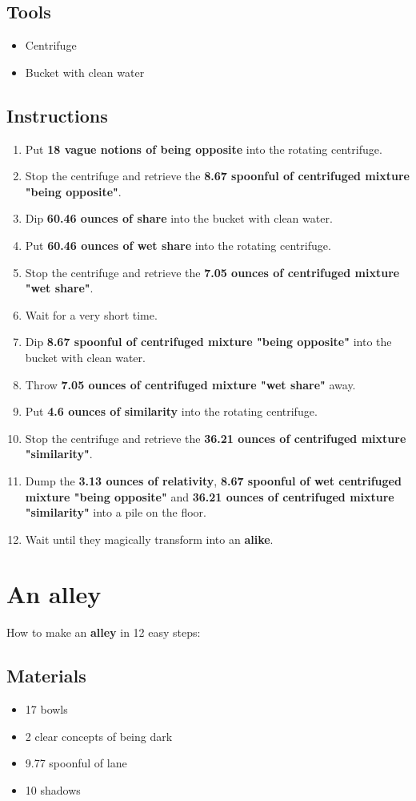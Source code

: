\documentclass{article}
\begin{document}
\subsection{Tools}\begin{itemize}
\item 
Centrifuge
\item 
Bucket with clean water
\end{itemize}
\subsection{Instructions}\begin{enumerate}
\item 
Put \textbf{18 vague notions of being opposite} into the rotating centrifuge.
\item 
Stop the centrifuge and retrieve the \textbf{8.67 spoonful of centrifuged mixture "being opposite"}.
\item 
Dip \textbf{60.46 ounces of share} into the bucket with clean water.
\item 
Put \textbf{60.46 ounces of wet share} into the rotating centrifuge.
\item 
Stop the centrifuge and retrieve the \textbf{7.05 ounces of centrifuged mixture "wet share"}.
\item 
Wait for a very short time.
\item 
Dip \textbf{8.67 spoonful of centrifuged mixture "being opposite"} into the bucket with clean water.
\item 
Throw \textbf{7.05 ounces of centrifuged mixture "wet share"} away.
\item 
Put \textbf{4.6 ounces of similarity} into the rotating centrifuge.
\item 
Stop the centrifuge and retrieve the \textbf{36.21 ounces of centrifuged mixture "similarity"}.
\item 
Dump the \textbf{3.13 ounces of relativity}, \textbf{8.67 spoonful of wet centrifuged mixture "being opposite"} and \textbf{36.21 ounces of centrifuged mixture "similarity"} into a pile on the floor.
\item 
Wait until they magically transform into an \textbf{alike}.
\end{enumerate}
\newpage
\section{An alley}How to make an \textbf{alley} in 12 easy steps:

\subsection{Materials}\begin{itemize}
\item 
17 bowls
\item 
2 clear concepts of being dark
\item 
9.77 spoonful of lane
\item 
10 shadows
\end{itemize}
\end{document}
